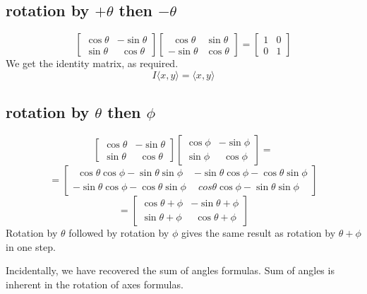 \documentclass[11pt, oneside]{article}
\begin{document}
\subsection*{rotation by $+ \theta$ then $- \theta$}

\[
\begin{bmatrix}  
\cos \theta & -\sin \theta \\
\sin \theta & \ \  \cos \theta
\end{bmatrix}
\begin{bmatrix}  
\ \ \cos \theta & \sin \theta \\
- \sin \theta &  \cos \theta
\end{bmatrix}
=
\begin{bmatrix}  
1 & 0 \\
0 & 1
\end{bmatrix}
\]
We get the identity matrix, as required.
\[ I \langle x,y \rangle = \langle x,y \rangle \]

\subsection*{rotation by $\theta$ then $\phi$}

\[
\begin{bmatrix}  
\cos \theta & -\sin \theta \\
\sin \theta & \ \  \cos \theta
\end{bmatrix}
\begin{bmatrix}  
\cos \phi & - \sin \phi \\
\sin \phi & \ \ \cos \phi
\end{bmatrix}
=
\]
\[ =
\begin{bmatrix}  
\ \ \cos \theta \cos \phi -  \sin \theta \sin \phi & - \sin \theta \cos \phi - \cos \theta \sin \phi \\
- \sin \theta \cos \phi - \cos \theta \sin \phi & \ \ cos \theta \cos \phi -  \sin \theta \sin \phi 
\end{bmatrix}
\]
\[
=
\begin{bmatrix}  
\cos \theta + \phi & - \sin \theta + \phi \\
\sin \theta + \phi & \ \ \cos \theta + \phi
\end{bmatrix}
\]
Rotation by $\theta$ followed by rotation by $\phi$ gives the same result as rotation by $\theta + \phi$ in one step.

Incidentally, we have recovered the sum of angles formulas.  Sum of angles is inherent in the rotation of axes formulas.
\end{document}
